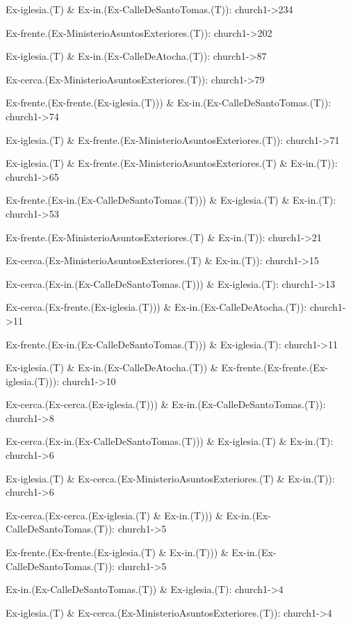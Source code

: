 \footnotesize{
\hspace*{0.6cm}Ex-iglesia.(T) \& Ex-in.(Ex-CalleDeSantoTomas.(T)): church1->234

Ex-frente.(Ex-MinisterioAsuntosExteriores.(T)): church1->202

Ex-iglesia.(T) \& Ex-in.(Ex-CalleDeAtocha.(T)): church1->87

Ex-cerca.(Ex-MinisterioAsuntosExteriores.(T)): church1->79

Ex-frente.(Ex-frente.(Ex-iglesia.(T))) \& Ex-in.(Ex-CalleDeSantoTomas.(T)): church1->74

Ex-iglesia.(T) \& Ex-frente.(Ex-MinisterioAsuntosExteriores.(T)): church1->71

Ex-iglesia.(T) \& Ex-frente.(Ex-MinisterioAsuntosExteriores.(T) \& Ex-in.(T)): church1->65

Ex-frente.(Ex-in.(Ex-CalleDeSantoTomas.(T))) \& Ex-iglesia.(T) \& Ex-in.(T): church1->53

Ex-frente.(Ex-MinisterioAsuntosExteriores.(T) \& Ex-in.(T)): church1->21

Ex-cerca.(Ex-MinisterioAsuntosExteriores.(T) \& Ex-in.(T)): church1->15

Ex-cerca.(Ex-in.(Ex-CalleDeSantoTomas.(T))) \& Ex-iglesia.(T): church1->13

Ex-cerca.(Ex-frente.(Ex-iglesia.(T))) \& Ex-in.(Ex-CalleDeAtocha.(T)): church1->11

Ex-frente.(Ex-in.(Ex-CalleDeSantoTomas.(T))) \& Ex-iglesia.(T): church1->11

Ex-iglesia.(T) \& Ex-in.(Ex-CalleDeAtocha.(T)) \& Ex-frente.(Ex-frente.(Ex-iglesia.(T))): church1->10

Ex-cerca.(Ex-cerca.(Ex-iglesia.(T))) \& Ex-in.(Ex-CalleDeSantoTomas.(T)): church1->8

Ex-cerca.(Ex-in.(Ex-CalleDeSantoTomas.(T))) \& Ex-iglesia.(T) \& Ex-in.(T): church1->6

Ex-iglesia.(T) \& Ex-cerca.(Ex-MinisterioAsuntosExteriores.(T) \& Ex-in.(T)): church1->6

Ex-cerca.(Ex-cerca.(Ex-iglesia.(T) \& Ex-in.(T))) \& Ex-in.(Ex-CalleDeSantoTomas.(T)): church1->5

Ex-frente.(Ex-frente.(Ex-iglesia.(T) \& Ex-in.(T))) \& Ex-in.(Ex-CalleDeSantoTomas.(T)): church1->5

Ex-in.(Ex-CalleDeSantoTomas.(T)) \& Ex-iglesia.(T): church1->4

Ex-iglesia.(T) \& Ex-cerca.(Ex-MinisterioAsuntosExteriores.(T)): church1->4

}
